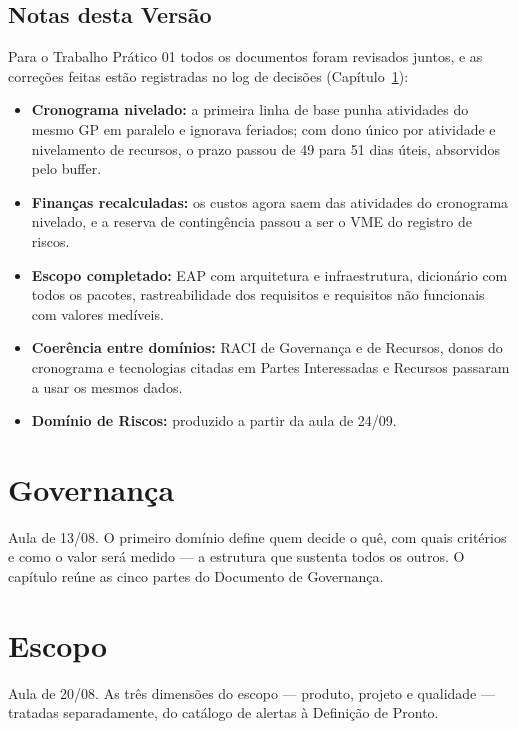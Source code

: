 \documentclass[11pt,a4paper]{report}
\newcommand{\subdocumento}[1]{\begingroup\let\section\subsection\let\subsection\subsubsection\endgroup}
\newcommand{\secaosemnumero}[1]{\section*{#1}\addcontentsline{toc}{section}{#1}}
\begin{document}
\secaosemnumero{Notas desta Versão}
Para o Trabalho Prático 01 todos os documentos foram revisados juntos, e as correções feitas estão registradas no log de decisões (Capítulo~\ref{cap:governanca}):
\begin{itemize}[itemsep=2pt]
  \item \textbf{Cronograma nivelado:} a primeira linha de base punha atividades do mesmo GP em paralelo e ignorava feriados; com dono único por atividade e nivelamento de recursos, o prazo passou de 49 para 51 dias úteis, absorvidos pelo buffer.
  \item \textbf{Finanças recalculadas:} os custos agora saem das atividades do cronograma nivelado, e a reserva de contingência passou a ser o VME do registro de riscos.
  \item \textbf{Escopo completado:} EAP com arquitetura e infraestrutura, dicionário com todos os pacotes, rastreabilidade dos requisitos e requisitos não funcionais com valores medíveis.
  \item \textbf{Coerência entre domínios:} RACI de Governança e de Recursos, donos do cronograma e tecnologias citadas em Partes Interessadas e Recursos passaram a usar os mesmos dados.
  \item \textbf{Domínio de Riscos:} produzido a partir da aula de 24/09.
\end{itemize}

\chapter{Governança}\label{cap:governanca}
\noindent Aula de 13/08. O primeiro domínio define quem decide o quê, com quais critérios e como o valor será medido --- a estrutura que sustenta todos os outros. O capítulo reúne as cinco partes do Documento de Governança.
\subdocumento{../governanca/termo_de_abertura}
\subdocumento{../governanca/papeis_e_raci}
\subdocumento{../governanca/modelo_e_escalonamento}
\subdocumento{../governanca/metricas_e_sinal}
\subdocumento{../governanca/regras_e_registro}

\chapter{Escopo}\label{cap:escopo}
\noindent Aula de 20/08. As três dimensões do escopo --- produto, projeto e qualidade --- tratadas separadamente, do catálogo de alertas à Definição de Pronto.
\end{document}
